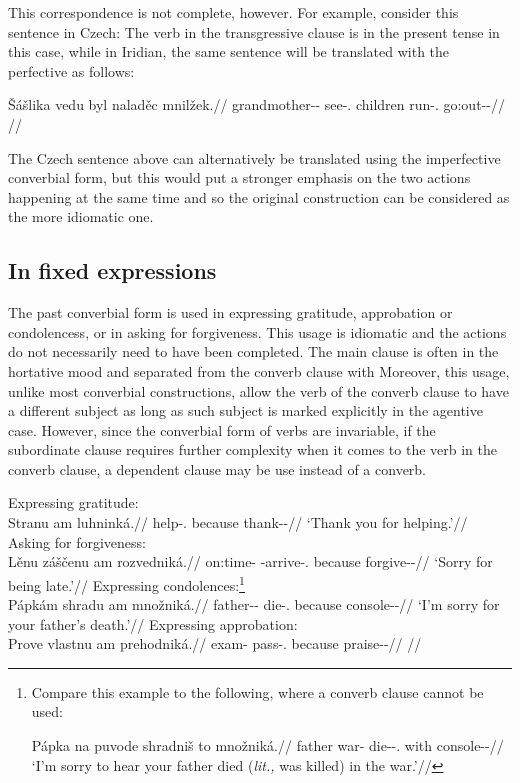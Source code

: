 This correspondence is not complete, however. For example, consider this
sentence in Czech:  The verb in the
transgressive clause is in the present tense in this case, while in Iridian, the
same sentence will be translated with the perfective as follows:

\pex
\begingl
\gla Šášlika vedu byl naladěc mnilžek.//
\glb grandmother-\Dim{}-\Acc{} see-\Cv{}.\Pf{} children run-\Cv{}.\Ipf{} go:out-\Av{}-\Pf{}//
\glft {}//
\endgl
\xe

The Czech sentence above can alternatively be translated using the
imperfective converbial form, but this would put a stronger emphasis on the two
actions happening at the same time and so the original construction can be
considered as the more idiomatic one.

\subsection{In fixed expressions}

The past converbial form is used in expressing gratitude, approbation or
condolencess, or in asking for forgiveness. This usage is idiomatic and the
actions do not necessarily need to have been completed. The main clause is often
in the hortative mood and separated from the converb
clause with  Moreover, this usage, unlike most converbial
constructions, allow the verb of the converb clause to have a different subject
as long as such subject is marked explicitly in the agentive case. However,
since the converbial form of verbs are invariable, if the subordinate clause
requires further complexity when it comes to the verb in the converb clause, a
dependent  clause may be use instead of a converb.

\pex
\a Expressing gratitude:\\
\begingl
\gla Stranu am luhninká.//
\glb help-\Cv{}.\Pf{} because thank-\Pv{}-\Hort{}//
\glft `Thank you for helping.'//
\endgl
\a Asking for forgiveness:\\
\begingl
\gla Lěnu záščenu am rozvedniká.//
\glb on:time-\Ins{} \Neg{}-arrive-\Cv{}.\Pf{} because forgive-\Pv{}-\Hort{}//
\glft `Sorry for being late.'//
\endgl
\a Expressing condolences:\footnote{Compare this example to the following, where
a converb clause cannot be used:

\ex[lingstyle=fnex,belowexskip=-1em]
\begingl
\gla Pápka na puvode shradniš to množniká.//
\glb father \Loc{} war-\Acc{} die-\Pv{}-\Subj.\Pf{} \Rz{} with console-\Pv{}-\Hort{}//
\glft `I'm sorry to hear your father died (\emph{lit.,} was killed) in the war.'//
\endgl\xe}\\
\begingl
\gla Pápkám shradu am množniká.//
\glb father-\Dim{}-\Agt{} die-\Cv{}.\Pf{} because console-\Pv{}-\Hort{}//
\glft `I'm sorry for your father's death.'//
\endgl
\a Expressing approbation:\\
\begingl
\gla Prove vlastnu am prehodniká.//
\glb exam-\Acc{} pass-\Cv{}.\Pf{} because praise-\Pv{}-\Hort{}//
\glft {}//
\endgl
\xe

